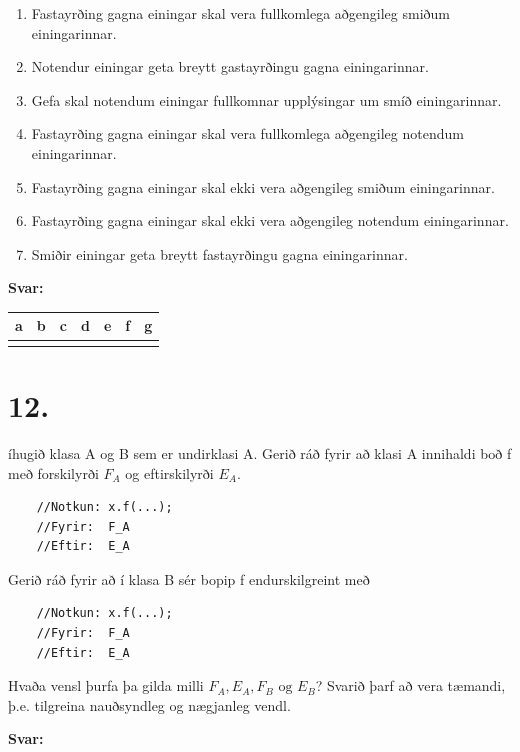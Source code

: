 \documentclass{article}
\newcommand{\sv}{\textbf{Svar:}}
\newcommand{\enum}{\begin{enumerate}[label = \alph*.]}
\begin{document}
    \enum
    \item Fastayrðing gagna einingar skal vera fullkomlega aðgengileg smiðum einingarinnar.
    \item Notendur einingar geta breytt gastayrðingu gagna einingarinnar.
    \item Gefa skal notendum einingar fullkomnar upplýsingar um smíð einingarinnar.
    \item Fastayrðing gagna einingar skal vera fullkomlega aðgengileg notendum einingarinnar.
    \item Fastayrðing gagna einingar skal ekki vera aðgengileg smiðum einingarinnar.
    \item Fastayrðing gagna einingar skal ekki vera aðgengileg notendum einingarinnar.
    \item Smiðir einingar geta breytt fastayrðingu gagna einingarinnar.
\end{enumerate}


    \sv

    
\begin{tabularx}{\textwidth}{ |X|X|X|X|X|X|X|}
    \hline
    \textbf{a}  & \textbf{b}  & \textbf{c}  & \textbf{d}  & \textbf{e}  & \textbf{f}  & \textbf{g} \\ \hline
     & & & & & & \\ \hline
 \end{tabularx}


 \newpage

 \section{12.}

 íhugið klasa A og B sem er undirklasi A. Gerið ráð fyrir að klasi A innihaldi boð f með forskilyrði $F_A$ og eftirskilyrði $E_A$.
 \begin{verbatim}
    //Notkun: x.f(...);
    //Fyrir:  F_A
    //Eftir:  E_A
 \end{verbatim}

 Gerið ráð fyrir að í klasa B sér bopip f endurskilgreint með
 \begin{verbatim}
    //Notkun: x.f(...);
    //Fyrir:  F_A
    //Eftir:  E_A
 \end{verbatim}

 Hvaða vensl þurfa þa gilda milli $F_A, E_A, F_B \text{ og } E_B$? Svarið þarf að
 vera tæmandi, þ.e. tilgreina nauðsyndleg og nægjanleg vendl.

 \sv

 \newpage
\end{document}

